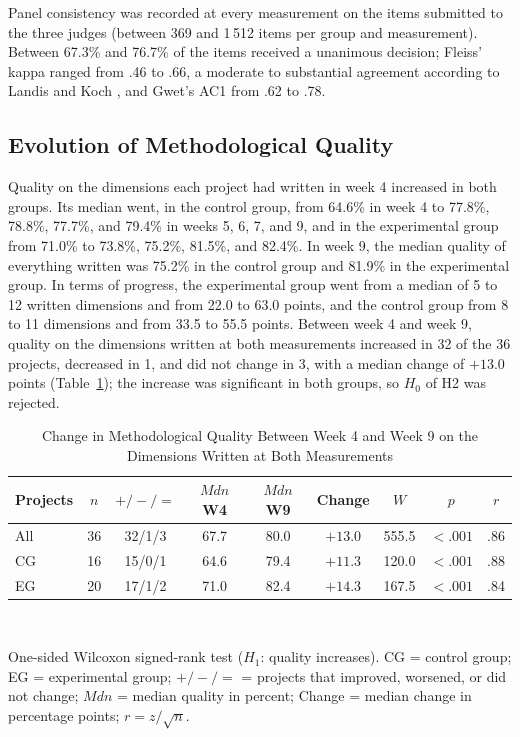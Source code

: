 \documentclass[journal]{IEEEtran}
\begin{document}
Panel consistency was recorded at every measurement on the items submitted to the three judges (between 369 and 1\,512 items per group and measurement). Between 67.3\% and 76.7\% of the items received a unanimous decision; Fleiss' kappa ranged from .46 to .66, a moderate to substantial agreement according to Landis and Koch \cite{landis1977}, and Gwet's AC1 from .62 to .78.

\subsection{Evolution of Methodological Quality}

Quality on the dimensions each project had written in week 4 increased in both groups. Its median went, in the control group, from 64.6\% in week 4 to 77.8\%, 78.8\%, 77.7\%, and 79.4\% in weeks 5, 6, 7, and 9, and in the experimental group from 71.0\% to 73.8\%, 75.2\%, 81.5\%, and 82.4\%. In week 9, the median quality of everything written was 75.2\% in the control group and 81.9\% in the experimental group. In terms of progress, the experimental group went from a median of 5 to 12 written dimensions and from 22.0 to 63.0 points, and the control group from 8 to 11 dimensions and from 33.5 to 55.5 points. Between week 4 and week 9, quality on the dimensions written at both measurements increased in 32 of the 36 projects, decreased in 1, and did not change in 3, with a median change of $+13.0$ points (Table~\ref{tab:wilcoxon}); the increase was significant in both groups, so $H_0$ of H2 was rejected.

\begin{table}[!t]
\caption{Change in Methodological Quality Between Week 4 and Week 9 on the Dimensions Written at Both Measurements}
\label{tab:wilcoxon}
\centering
\scriptsize
\setlength{\tabcolsep}{3.5pt}
\begin{tabular}{lcccccccc}
\toprule
Projects & $n$ & $+/-/=$ & $Mdn$ W4 & $Mdn$ W9 & Change & $W$ & $p$ & $r$ \\
\midrule
All & 36 & 32/1/3 & 67.7 & 80.0 & $+13.0$ & 555.5 & $<.001$ & .86 \\
CG & 16 & 15/0/1 & 64.6 & 79.4 & $+11.3$ & 120.0 & $<.001$ & .88 \\
EG & 20 & 17/1/2 & 71.0 & 82.4 & $+14.3$ & 167.5 & $<.001$ & .84 \\
\bottomrule
\end{tabular}
\\[2pt]
\raggedright\scriptsize One-sided Wilcoxon signed-rank test ($H_1$: quality increases). CG = control group; EG = experimental group; $+/-/=$ = projects that improved, worsened, or did not change; $Mdn$ = median quality in percent; Change = median change in percentage points; $r = z/\sqrt{n}$.
\end{table}
\end{document}
